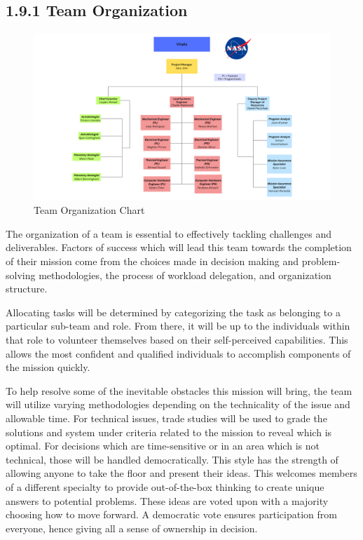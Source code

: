 \subsection*{1.9.1 Team Organization}

\begin{figure}[H]
    \centering
    \includegraphics[width=1\textwidth]{images/orgchart.png}
    \caption{Team Organization Chart}
    \label{fig:orgchart}
\end{figure}

The organization of a team is essential to effectively tackling challenges and deliverables. Factors of success which will lead this team towards the completion of their mission come from the choices made in decision making and problem-solving methodologies, the process of workload delegation, and organization structure.

Allocating tasks will be determined by categorizing the task as belonging to a particular sub-team and role. From there, it will be up to the individuals within that role to volunteer themselves based on their self-perceived capabilities. This allows the most confident and qualified individuals to accomplish components of the mission quickly.

To help resolve some of the inevitable obstacles this mission will bring, the team will utilize varying methodologies depending on the technicality of the issue and allowable time. For technical issues, trade studies will be used to grade the solutions and system under criteria related to the mission to reveal which is optimal. For decisions which are time-sensitive or in an area which is not technical, those will be handled democratically. This style has the strength of allowing anyone to take the floor and present their ideas. This welcomes members of a different specialty to provide out-of-the-box thinking to create unique answers to potential problems. These ideas are voted upon with a majority choosing how to move forward. A democratic vote ensures participation from everyone, hence giving all a sense of ownership in decision.

